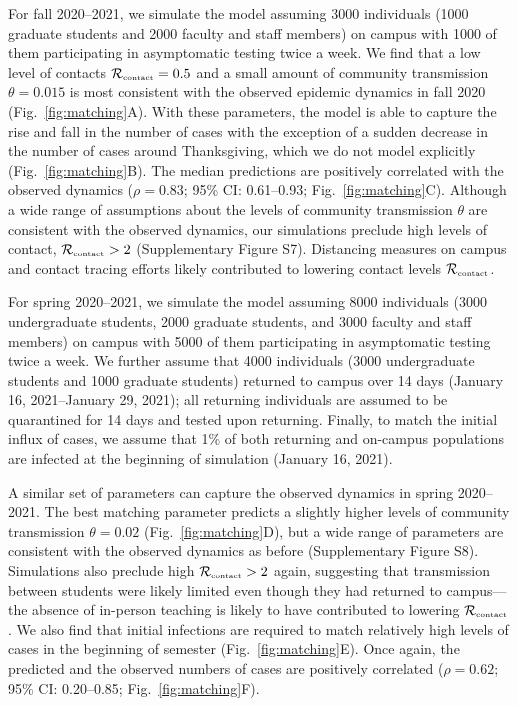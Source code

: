 \documentclass[12pt]{article}
\newcommand{\fref}[1]{Fig.~\ref{fig:#1}}
\newcommand{\Rx}[1]{\ensuremath{{\mathcal R}_{#1}}}
\newcommand{\Rc}{\Rx{\textrm{\tiny{contact}}}}
\begin{document}
For fall 2020--2021, we simulate the model assuming 3000 individuals (1000 graduate students and 2000 faculty and staff members) on campus with 1000 of them participating in asymptomatic testing twice a week.
We find that a low level of contacts $\Rc=0.5$ and a small amount of community transmission $\theta=0.015$ is most consistent with the observed epidemic dynamics in fall 2020 (\fref{matching}A).
With these parameters, the model is able to capture the rise and fall in the number of cases with the exception of a sudden decrease in the number of cases around Thanksgiving, which we do not model explicitly (\fref{matching}B).
The median predictions are positively correlated with the observed dynamics ($\rho = 0.83$; 95\% CI: 0.61--0.93; \fref{matching}C).
Although a wide range of assumptions about the levels of community transmission $\theta$ are consistent with the observed dynamics, our simulations preclude high levels of contact, $\Rc > 2$ (Supplementary Figure S7).
Distancing measures on campus and contact tracing efforts likely contributed to lowering contact levels $\Rc$.

For spring 2020--2021, we simulate the model assuming 8000 individuals (3000 undergraduate students, 2000 graduate students, and 3000 faculty and staff members) on campus with 5000 of them participating in asymptomatic testing twice a week.
We further assume that 4000 individuals (3000 undergraduate students and 1000 graduate students) returned to campus over 14 days (January 16, 2021--January 29, 2021);
all returning individuals are assumed to be quarantined for 14 days and tested upon returning. 
Finally, to match the initial influx of cases, we assume that 1\% of both returning and on-campus populations are infected at the beginning of simulation (January 16, 2021).

A similar set of parameters can capture the observed dynamics in spring 2020--2021.
The best matching parameter predicts a slightly higher levels of community transmission $\theta=0.02$ (\fref{matching}D), but a wide range of parameters are consistent with the observed dynamics as before (Supplementary Figure S8). 
Simulations also preclude high $\Rc > 2$ again, suggesting that transmission between students were likely limited even though they had returned to campus---the absence of in-person teaching is likely to have contributed to lowering $\Rc$.
We also find that initial infections are required to match relatively high levels of cases in the beginning of semester (\fref{matching}E). 
Once again, the predicted and the observed numbers of cases are positively correlated ($\rho = 0.62$; 95\% CI: 0.20--0.85; \fref{matching}F).
\end{document}
